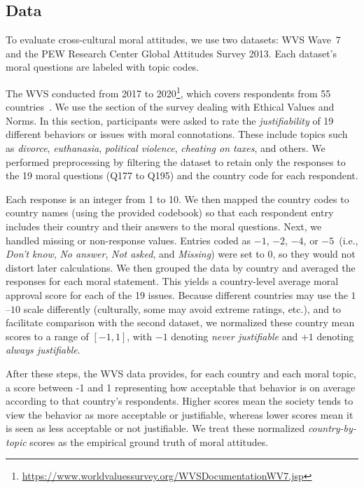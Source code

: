 \documentclass[runningheads]{llncs}
\begin{document}
\subsection{Data}
\label{sec:data}

To evaluate cross-cultural moral attitudes, we use two datasets: WVS Wave~7 and the PEW Research Center Global Attitudes Survey 2013. Each dataset's moral questions are labeled with topic codes. 

The WVS conducted from 2017 to 2020\footnote{\url{https://www.worldvaluessurvey.org/WVSDocumentationWV7.jsp}}, which covers respondents from 55 countries~\cite{Inglehart2014,Haerpfer2022}. We use the section of the survey dealing with Ethical Values and Norms. In this section, participants were asked to rate the \emph{justifiability} of 19 different behaviors or issues with moral connotations. These include topics such as \emph{divorce}, \emph{euthanasia}, \emph{political violence}, \emph{cheating on taxes}, and others. We performed preprocessing by filtering the dataset to retain only the responses to the 19 moral questions (Q177 to Q195) and the country code for each respondent.


Each response is an integer from 1 to 10. We then mapped the country codes to country names (using the provided codebook) so that each respondent entry includes their country and their answers to the moral questions. Next, we handled missing or non-response values. Entries coded as \(-1\), \(-2\), \(-4\), or \(-5\)~(i.e., \emph{Don't know}, \emph{No answer}, \emph{Not asked}, and \emph{Missing}) were set to \(0\), so they would not distort later calculations. We then grouped the data by country and averaged the responses for each moral statement. This yields a country-level average moral approval score for each of the 19 issues. Because different countries may use the \(1\)–\(10\) scale differently (culturally, some may avoid extreme ratings, etc.), and to facilitate comparison with the second dataset, we normalized these country mean scores to a range of \([-1, 1]\), with \(-1\) denoting \emph{never justifiable} and \(+1\) denoting \emph{always justifiable}.

After these steps, the WVS data provides, for each country and each moral topic, a score between -1 and 1 representing how acceptable that behavior is on average according to that country's respondents. Higher scores mean the society tends to view the behavior as more acceptable or justifiable, whereas lower scores mean it is seen as less acceptable or not justifiable. We treat these normalized \emph{country-by-topic} scores as the empirical ground truth of moral attitudes.
\end{document}
